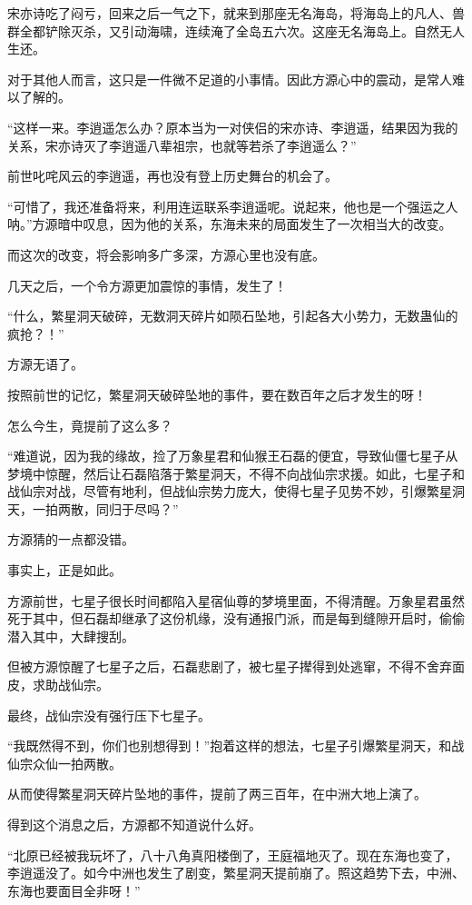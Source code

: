 \begin{this_body}
宋亦诗吃了闷亏，回来之后一气之下，就来到那座无名海岛，将海岛上的凡人、兽群全都铲除灭杀，又引动海啸，连续淹了全岛五六次。这座无名海岛上。自然无人生还。

对于其他人而言，这只是一件微不足道的小事情。因此方源心中的震动，是常人难以了解的。

“这样一来。李逍遥怎么办？原本当为一对侠侣的宋亦诗、李逍遥，结果因为我的关系，宋亦诗灭了李逍遥八辈祖宗，也就等若杀了李逍遥么？”

前世叱咤风云的李逍遥，再也没有登上历史舞台的机会了。

“可惜了，我还准备将来，利用连运联系李逍遥呢。说起来，他也是一个强运之人呐。”方源暗中叹息，因为他的关系，东海未来的局面发生了一次相当大的改变。

而这次的改变，将会影响多广多深，方源心里也没有底。

几天之后，一个令方源更加震惊的事情，发生了！

“什么，繁星洞天破碎，无数洞天碎片如陨石坠地，引起各大小势力，无数蛊仙的疯抢？！”

方源无语了。

按照前世的记忆，繁星洞天破碎坠地的事件，要在数百年之后才发生的呀！

怎么今生，竟提前了这么多？

“难道说，因为我的缘故，捡了万象星君和仙猴王石磊的便宜，导致仙僵七星子从梦境中惊醒，然后让石磊陷落于繁星洞天，不得不向战仙宗求援。如此，七星子和战仙宗对战，尽管有地利，但战仙宗势力庞大，使得七星子见势不妙，引爆繁星洞天，一拍两散，同归于尽吗？”

方源猜的一点都没错。

事实上，正是如此。

方源前世，七星子很长时间都陷入星宿仙尊的梦境里面，不得清醒。万象星君虽然死于其中，但石磊却继承了这份机缘，没有通报门派，而是每到缝隙开启时，偷偷潜入其中，大肆搜刮。

但被方源惊醒了七星子之后，石磊悲剧了，被七星子撵得到处逃窜，不得不舍弃面皮，求助战仙宗。

最终，战仙宗没有强行压下七星子。

“我既然得不到，你们也别想得到！”抱着这样的想法，七星子引爆繁星洞天，和战仙宗众仙一拍两散。

从而使得繁星洞天碎片坠地的事件，提前了两三百年，在中洲大地上演了。

得到这个消息之后，方源都不知道说什么好。

“北原已经被我玩坏了，八十八角真阳楼倒了，王庭福地灭了。现在东海也变了，李逍遥没了。如今中洲也发生了剧变，繁星洞天提前崩了。照这趋势下去，中洲、东海也要面目全非呀！”


\end{this_body}
